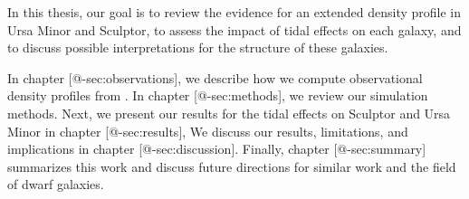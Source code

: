 In this thesis, our goal is to review the evidence for an extended
density profile in Ursa Minor and Sculptor, to assess the impact of
tidal effects on each galaxy, and to discuss possible interpretations
for the structure of these galaxies.

In chapter {[}@-sec:observations{]}, we describe how we compute
observational density profiles from \citet{jensen+2024}. In chapter
{[}@-sec:methods{]}, we review our simulation methods. Next, we present
our results for the tidal effects on Sculptor and Ursa Minor in chapter
{[}@-sec:results{]}, We discuss our results, limitations, and
implications in chapter {[}@-sec:discussion{]}. Finally, chapter
{[}@-sec:summary{]} summarizes this work and discuss future directions
for similar work and the field of dwarf galaxies.
